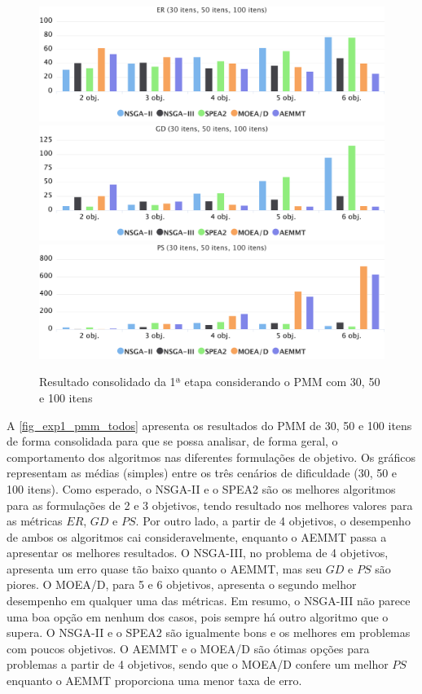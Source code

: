 \begin{figure}[!htbp]
	\includegraphics[width=1\textwidth]{cap_experimentos/figs/etapa1/er-mkp-todos}
	\includegraphics[width=1\textwidth]{cap_experimentos/figs/etapa1/gd-mkp-todos}
	\includegraphics[width=1\textwidth]{cap_experimentos/figs/etapa1/ps-mkp-todos}
	\caption{\label{fig_exp1_pmm_todos}Resultado consolidado da 1ª etapa considerando o PMM com 30, 50 e 100 itens}
\end{figure}

A \autoref{fig_exp1_pmm_todos} apresenta os resultados do PMM de 30, 50 e 100 itens de forma consolidada para que se possa analisar, de forma geral, o comportamento dos algoritmos nas diferentes formulações de objetivo. Os gráficos representam as médias (simples) entre os três cenários de dificuldade (30, 50 e 100 itens). Como esperado, o NSGA-II e o SPEA2 são os melhores algoritmos para as formulações de 2 e 3 objetivos, tendo resultado nos melhores valores para as métricas $ER$, $GD$ e $PS$. Por outro lado, a partir de 4 objetivos, o desempenho de ambos os algoritmos cai consideravelmente, enquanto o AEMMT passa a apresentar os melhores resultados. O NSGA-III, no problema de 4 objetivos, apresenta um erro quase tão baixo quanto o AEMMT, mas seu $GD$ e $PS$ são piores. O MOEA/D, para 5 e 6 objetivos, apresenta o segundo melhor desempenho em qualquer uma das métricas. Em resumo, o NSGA-III não parece uma boa opção em nenhum dos casos, pois sempre há outro algoritmo que o supera. O NSGA-II e o SPEA2 são igualmente bons e os melhores em problemas com poucos objetivos. O AEMMT e o MOEA/D são ótimas opções para problemas a partir de 4 objetivos, sendo que o MOEA/D confere um melhor $PS$ enquanto o AEMMT proporciona uma menor taxa de erro.


